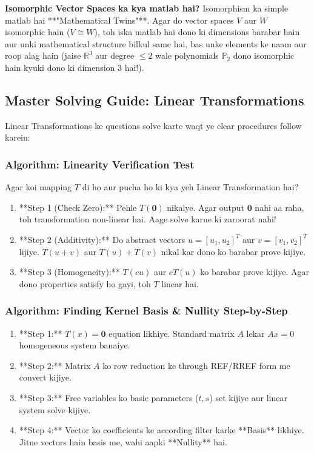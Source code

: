 \documentclass[11pt,a4paper]{article}
\begin{document}
\begin{hinglishbox}
\textbf{Isomorphic Vector Spaces ka kya matlab hai?}
Isomorphism ka simple matlab hai **"Mathematical Twins"**. Agar do vector spaces $V$ aur $W$ isomorphic hain ($V \cong W$), toh iska matlab hai dono ki dimensions barabar hain aur unki mathematical structure bilkul same hai, bas unke elements ke naam aur roop alag hain (jaise $\mathbb{R}^3$ aur degree $\le 2$ wale polynomials $\mathbb{P}_2$ dono isomorphic hain kyuki dono ki dimension $3$ hai!).
\end{hinglishbox}

\subsection{Master Solving Guide: Linear Transformations}

Linear Transformations ke questions solve karte waqt ye clear procedures follow karein:

\subsubsection{Algorithm: Linearity Verification Test}
Agar koi mapping $T$ di ho aur pucha ho ki kya yeh Linear Transformation hai?
\begin{enumerate}
    \item **Step 1 (Check Zero):** Pehle $T(\mathbf{0})$ nikalye. Agar output $\mathbf{0}$ nahi aa raha, toh transformation non-linear hai. Aage solve karne ki zaroorat nahi!
    \item **Step 2 (Additivity):** Do abstract vectors $u = [u_1, u_2]^T$ aur $v = [v_1, v_2]^T$ lijiye. $T(u+v)$ aur $T(u) + T(v)$ nikal kar dono ko barabar prove kijiye.
    \item **Step 3 (Homogeneity):** $T(cu)$ aur $c T(u)$ ko barabar prove kijiye. Agar dono properties satisfy ho gayi, toh $T$ linear hai.
\end{enumerate}

\subsubsection{Algorithm: Finding Kernel Basis \& Nullity Step-by-Step}
\begin{enumerate}
    \item **Step 1:** $T(x) = \mathbf{0}$ equation likhiye. Standard matrix $A$ lekar $Ax = 0$ homogeneous system banaiye.
    \item **Step 2:** Matrix $A$ ko row reduction ke through REF/RREF form me convert kijiye.
    \item **Step 3:** Free variables ko basic parameters ($t, s$) set kijiye aur linear system solve kijiye.
    \item **Step 4:** Vector ko coefficients ke according filter karke **Basis** likhiye. Jitne vectors hain basis me, wahi aapki **Nullity** hai.
\end{enumerate}
\end{document}
